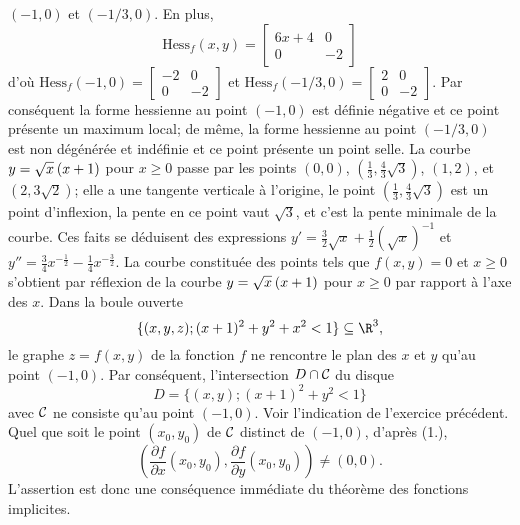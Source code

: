 {\begin{enumerate}
{$(-1,0)$ et $(-1/3,0)$.
En plus,
\[
\mathrm{Hess}_f(x,y)=\left[\begin{matrix} 
6x+4 & 0\\  0 & -2
\end{matrix}\right]
\] 
d'o\`u
$\mathrm{Hess}_f(-1,0)= \left[\begin{matrix} 
-2 &  0\\  0 & -2
\end{matrix}\right]$
et
$\mathrm{Hess}_f(-1/3,0)= \left[\begin{matrix} 
2 &  0\\  0 & -2
\end{matrix}\right]$.
Par cons\'equent la forme hessienne au point $(-1,0)$
est d\'efinie n\'egative et ce point pr\'esente  un maximum local;
de m\^eme, la forme hessienne au point $(-1/3,0)$
est non d\'eg\'en\'er\'ee  et ind\'efinie 
et ce point pr\'esente  un point selle.
La courbe $y= \sqrt{x} \hskip 2pt (x+1)$ pour $x\geq 0$
passe par les points $(0,0)$, $(\tfrac 13,\tfrac 43 \sqrt 3)$, 
$(1,2)$, et $(2,3 \sqrt 2)$;
elle a une tangente verticale \`a l'origine,
le point $(\tfrac 13,\tfrac 43 \sqrt 3)$
est un point d'inflexion, la pente en ce point vaut $\sqrt 3$,
et c'est la pente minimale de la courbe.
Ces faits se d\'eduisent
des expressions
$y'= \tfrac 32 \sqrt x + \tfrac 12 (\sqrt x)^{-1}$ et
$y''= \tfrac 34 x^{-\tfrac 12} - \tfrac 14 x^{-\tfrac 32}$.
La courbe constitu\'ee des points tels que $f(x,y)=0$ et $x \geq 0$
s'obtient par r\'eflexion de la courbe
$y= \sqrt{x} \hskip 2pt (x+1)$ pour $x\geq 0$
par rapport \`a l'axe des $x$.
Dans la boule ouverte 
\[
\{(x,y,z);(x+1)^2+y^2+x^2 <1\} \subseteq \R^3, 
\]
le graphe
$z=f(x,y)$ de la fonction $f$ ne rencontre le plan des $x$ et $y$ qu'au point
$(-1,0)$. Par cons\'equent, l'intersection 
$D \cap \cal C$ du disque
\[
D=\{(x,y); (x+1)^2+y^2<1\}
\]
avec $\cal C$ ne consiste qu'au point $(-1,0)$.
Voir l'indication de l'exercice pr\'ec\'edent.
Quel que soit le point 
$(x_0,y_0)$ de ${\cal C}$
distinct de  $(-1,0)$,
d'apr\`es (1.),
\[
\left(\frac{\partial f}{\partial x}(x_0,y_0),\frac{\partial f}{\partial y}(x_0,y_0) \right) 
\ne (0,0).
\] 
L'assertion est donc une cons\'equence imm\'ediate du th\'eor\`eme des 
fonctions implicites.
}
\end{enumerate}
}
